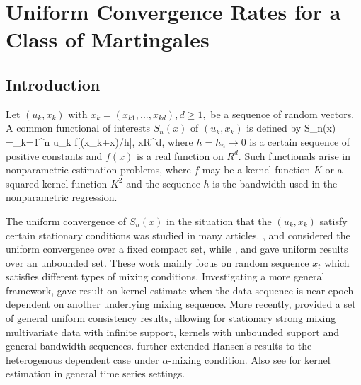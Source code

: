 
\chapter{Uniform Convergence Rates for a Class of Martingales}
\ifpdf
    \graphicspath{{Chapter1/Chapter1Figs/PNG/}{Chapter1/Chapter1Figs/PDF/}{Chapter1/Chapter1Figs/}}
\else
    \graphicspath{{Chapter1/Chapter1Figs/EPS/}{Chapter1/Chapter1Figs/}}
\fi

\section{Introduction}
Let $(u_k, x_k)$ with $x_k=(x_{k1},..., x_{kd}), d\ge 1,$ be a sequence of random vectors. A common functional of interests $S_n(x)$ of
$(u_k, x_k)$ is defined by
\be
  S_n(x) =\sum_{k=1}^n u_k f[(x_k+x)/h], \quad x\in R^d,
\ee
where $h=h_n\to 0$ is a certain sequence of positive constants and $f(x)$ is a real function on $R^d$. Such functionals arise in nonparametric estimation problems, where $f$ may be a kernel function $K$ or a squared kernel function $K^{2}$ and the
sequence $h$ is the bandwidth used in the nonparametric regression.


The uniform convergence of $S_n(x)$ in the situation that the $(u_k, x_k)$ satisfy certain stationary conditions was studied in many articles. \cite{liero1989}, \cite{peligrad1992} and \cite{nzedoukhan2004} considered the uniform convergence over a fixed compact set, while \cite{masry1996}, \cite{bosq1998} and \cite{fanyao2003} gave uniform results over an unbounded set. These work mainly focus on random sequence $x_t$ which satisfies different types of mixing conditions. Investigating a more general framework, \cite{andrews1995} gave result on kernel estimate when the data sequence is near-epoch dependent on another underlying mixing sequence. More recently, \cite{hansen2008} provided a set of general uniform consistency results, allowing for stationary strong mixing multivariate data with infinite support, kernels with unbounded support and general bandwidth sequences. \cite{kristensen2009} further extended Hansen's results to the heterogenous dependent case under $\alpha$-mixing condition. Also see \cite{wuhuanghuang2010} for kernel estimation in general time series settings.


